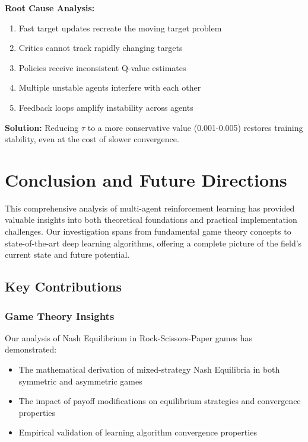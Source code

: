 \documentclass[conference]{IEEEtran}
\begin{document}
{{\textbf{Root Cause Analysis:}
\begin{enumerate}
    \item Fast target updates recreate the moving target problem
    \item Critics cannot track rapidly changing targets
    \item Policies receive inconsistent Q-value estimates
    \item Multiple unstable agents interfere with each other
    \item Feedback loops amplify instability across agents
\end{enumerate}

\textbf{Solution:}
Reducing $\tau$ to a more conservative value (0.001-0.005) restores training stability, even at the cost of slower convergence.

\section{Conclusion and Future Directions}

This comprehensive analysis of multi-agent reinforcement learning has provided valuable insights into both theoretical foundations and practical implementation challenges. Our investigation spans from fundamental game theory concepts to state-of-the-art deep learning algorithms, offering a complete picture of the field's current state and future potential.

\subsection{Key Contributions}

\subsubsection{Game Theory Insights}

Our analysis of Nash Equilibrium in Rock-Scissors-Paper games has demonstrated:

\begin{itemize}
    \item The mathematical derivation of mixed-strategy Nash Equilibria in both symmetric and asymmetric games
    \item The impact of payoff modifications on equilibrium strategies and convergence properties
    \item Empirical validation of learning algorithm convergence properties
\end{itemize}

}}
\end{document}
